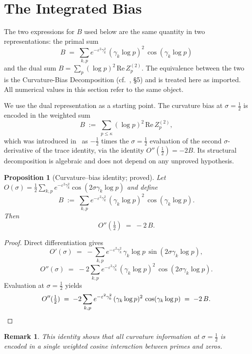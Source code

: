 \documentclass[11pt]{article}
\newtheorem{proposition}[theorem]{Proposition}
\newtheorem*{remark}{Remark}
\begin{document}
\section{The Integrated Bias}
\label{sec:intbias}

The two expressions for $B$ used below are the same quantity in two
representations: the primal sum
\[
B \;=\; \sum_{k,p} e^{-\varepsilon^2\gamma_k^2}\,(\gamma_k\log p)^2\,
         \cos(\gamma_k\log p)
\]
and the dual sum $B=\sum_p(\log p)^2\,\mathrm{Re}\,Z_p^{(2)}$.
The equivalence between the two is the Curvature-Bias Decomposition
(cf.~\cite{Paper5}, \S5)
and is treated here as imported.
All numerical values in this section refer to the same object.

We use the dual representation as a starting point.
The curvature bias at $\sigma=\tfrac12$ is encoded in the weighted sum
\[
B \;:=\; \sum_{p\le\kappa}(\log p)^2\,\mathrm{Re}\,Z_p^{(2)},
\]
which was introduced in~\cite{Paper5} as $-\tfrac12$ times the
$\sigma=\tfrac12$ evaluation of the second $\sigma$-derivative of the
trace identity, via the identity $O''(\tfrac12)=-2B$.
Its structural decomposition is algebraic and does not depend on any
unproved hypothesis.

\begin{proposition}[Curvature--bias identity; proved]
\label{prop:curv-bias}
Let $O(\sigma)=\tfrac12\sum_{k,p} e^{-\varepsilon^2\gamma_k^2}
\cos(2\sigma\gamma_k\log p)$ and define
\[
B \;:=\; \sum_{k,p} e^{-\varepsilon^2\gamma_k^2}\,(\gamma_k\log p)^2\,
         \cos(\gamma_k\log p).
\]
Then
\[
O''(\tfrac12) \;=\; -2\,B.
\]
\end{proposition}

\begin{proof}
Direct differentiation gives
\[
O'(\sigma) \;=\; -\sum_{k,p} e^{-\varepsilon^2\gamma_k^2}\,\gamma_k\log p\,
                \sin(2\sigma\gamma_k\log p),
\]
\[
O''(\sigma) \;=\; -2\sum_{k,p} e^{-\varepsilon^2\gamma_k^2}\,
                (\gamma_k\log p)^2\,\cos(2\sigma\gamma_k\log p).
\]
Evaluation at $\sigma=\tfrac12$ yields
\[
O''(\tfrac12) \;=\; -2\sum_{k,p} e^{-\varepsilon^2\gamma_k^2}\,
                (\gamma_k\log p)^2\,\cos(\gamma_k\log p) \;=\; -2\,B.
\qedhere
\]
\end{proof}

\begin{remark}
This identity shows that all curvature information at $\sigma=\tfrac12$
is encoded in a single weighted cosine interaction between primes and zeros.
\end{remark}
\end{document}
